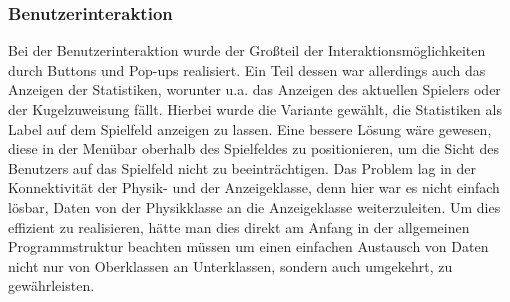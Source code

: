 \subsubsection{Benutzerinteraktion}
Bei der Benutzerinteraktion wurde der Großteil der Interaktionsmöglichkeiten durch Buttons und Pop-ups realisiert.
Ein Teil dessen war allerdings auch das Anzeigen der Statistiken, worunter u.a. das Anzeigen des aktuellen Spielers oder der Kugelzuweisung fällt. Hierbei wurde die Variante gewählt, die Statistiken als Label auf dem Spielfeld anzeigen zu lassen.
Eine bessere Lösung wäre gewesen, diese in der Menübar oberhalb des Spielfeldes zu positionieren, um die Sicht des Benutzers auf das Spielfeld nicht zu beeinträchtigen. 
Das Problem lag in der Konnektivität der Physik- und der Anzeigeklasse, denn hier war es nicht einfach lösbar, Daten von der Physikklasse an die Anzeigeklasse weiterzuleiten.
Um dies effizient zu realisieren, hätte man dies direkt am Anfang in der allgemeinen Programmstruktur beachten müssen um einen einfachen Austausch von Daten nicht nur von Oberklassen an Unterklassen, sondern auch umgekehrt, zu gewährleisten.